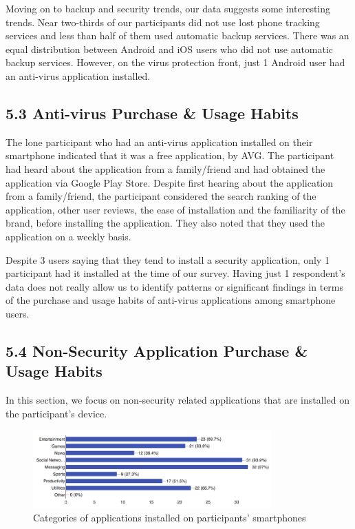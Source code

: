 \documentclass{sigchi}
\begin{document}
Moving on to backup and security trends, our data suggests some interesting trends. Near two-thirds of our participants did not use lost phone tracking services and less than half of them used automatic backup services. There was an equal distribution between Android and iOS users who did not use automatic backup services. However, on the virus protection front, just 1 Android user had an anti-virus application installed.

\subsection{5.3 Anti-virus Purchase \& Usage Habits}

The lone participant who had an anti-virus application installed on their smartphone indicated that it was a free application, by AVG. The participant had heard about the application from a family/friend and had obtained the application via Google Play Store. Despite first hearing about the application from a family/friend, the participant considered the search ranking of the application, other user reviews, the ease of installation and the familiarity of the brand, before installing the application. They also noted that they used the application on a weekly basis.

Despite 3 users saying that they tend to install a security application, only 1 participant had it installed at the time of our survey. Having just 1 respondent's data does not really allow us to identify patterns or significant findings in terms of the purchase and usage habits of anti-virus applications among smartphone users.

\subsection{5.4 Non-Security Application Purchase \& Usage Habits}

In this section, we focus on non-security related applications that are installed on the participant's device.
\begin{figure}[h]
    \includegraphics[height=3cm]{categories}
    \caption{Categories of applications installed on participants' smartphones}
    \label{fig:applicationtypes}
\end{figure}
\end{document}
